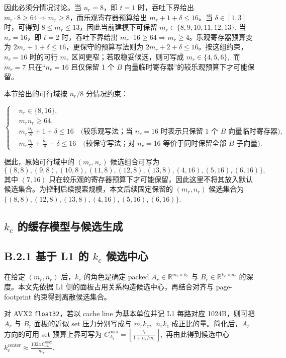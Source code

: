 \documentclass[a4paper,11pt,oneside]{article}
\begin{document}
因此必须分情况讨论。当 $n_r = 8$，即 $t = 1$ 时，吞吐下界给出 $m_r \cdot 8 \ge 64 \Rightarrow m_r \ge 8$，而乐观寄存器预算给出 $m_r + 1 + \delta \le 16$。当 $\delta \in [1,3]$ 时，可得到 $8 \le m_r \le 13$，因此当前建模下可保留
$
m_r \in \{8,9,10,11,12,13\}.
$
当 $n_r = 16$，即 $t = 2$ 时，吞吐下界给出 $m_r \cdot 16 \ge 64 \Rightarrow m_r \ge 4$。乐观寄存器预算变为 $2m_r + 1 + \delta \le 16$，更保守的预算写法则为 $2m_r + 2 + \delta \le 16$。按这组约束，$n_r = 16$ 时的可行 $m_r$ 区间更窄；若取稳妥候选，则可写成
$
m_r \in \{4,5,6\},
$
而 $m_r = 7$ 只在“$n_r = 16$ 且仅保留 1 个 $B$ 向量临时寄存器”的较乐观预算下才可能保留。

本节给出的可行域按 $n_r/8$ 分情况约束：

$$
\left\{
\begin{aligned}
&n_r \in \{8,16\},\\
&m_r n_r \ge 64,\\
&m_r \frac{n_r}{8} + 1 + \delta \le 16 \quad \text{(较乐观写法；当 } n_r=16 \text{ 时表示只保留 1 个 } B \text{ 向量临时寄存器)},\\
&m_r \frac{n_r}{8} + \frac{n_r}{8} + \delta \le 16 \quad \text{(较保守写法；对 } n_r=16 \text{ 等价于同时保留全部 } B \text{ 子向量)}.
\end{aligned}
\right.
$$

据此，原始可行域中的 $(m_r,n_r)$ 候选组合可写为
$$
\{(8,8),(9,8),(10,8),(11,8),(12,8),(13,8),(4,16),(5,16),(6,16)\},
$$
其中 $(7,16)$ 只在较乐观的寄存器预算下才可能保留，因此这里不将其放入默认候选集合。为控制后续搜索规模，本文后续固定保留的 $(m_r,n_r)$ 候选集合为
$
\{(8,8),(12,8),(13,8),(4,16),(5,16),(6,16)\}.
$

\subsection{$k_c$ 的缓存模型与候选生成}

\subsection*{B.2.1 基于 L1 的 $k_c$ 候选中心}

在给定 $(m_r,n_r)$ 后，$k_c$ 的角色是确定 packed $A_r \in \mathbb{R}^{m_r \times k_c}$ 与 $B_r \in \mathbb{R}^{k_c \times n_r}$ 的深度。本文先依据 L1 侧的面板占用关系构造候选中心，再结合对齐与 page-footprint 约束得到离散候选集合。

对 AVX2 \texttt{float32}，若以 cache line 为基本单位并记 L1 每路对应 1024B，则可把 $A_r$ 与 $B_r$ 面板的近似 set 压力分别写成与 $m_r k_c$、$n_r k_c$ 成正比的量。简化后，$A_r$ 方向的可用 set 预算上界可写为
$
C_{A_r}^{\max}=\left\lfloor \frac{7}{1+n_r/m_r} \right\rfloor,
$
再由此得到候选中心
$
k_c^{\text{center}} \approx \frac{1024\,C_{A_r}^{\max}}{m_r}.
$
\end{document}
